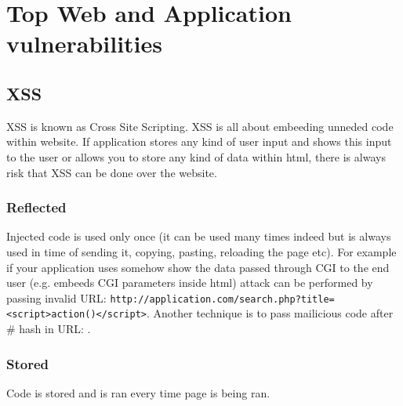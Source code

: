 \documentclass{article}[12pt]
\begin{document}





\section{Top Web and Application vulnerabilities}




\subsection{XSS} XSS is known as Cross Site Scripting. XSS is all about embeeding unneded code within website. If application stores any kind of user input and shows this input to the user or allows you to store any kind of data within html, there is always risk that XSS can be done over the website.

\subsubsection{Reflected} Injected code is used only once (it can be used many times indeed but is always used in time of sending it, copying, pasting, reloading the page etc). For example if your application uses somehow show the data passed through CGI to the end user (e.g. embeeds CGI parameters inside html) attack can be
performed by passing invalid URL: \texttt{http://application.com/search.php?title=<script>action()</script>}. Another technique is to pass mailicious code after \# hash in URL: \texttt{}.
\subsubsection{Stored}  Code is stored and is ran every time page is being ran.
\end{document}
